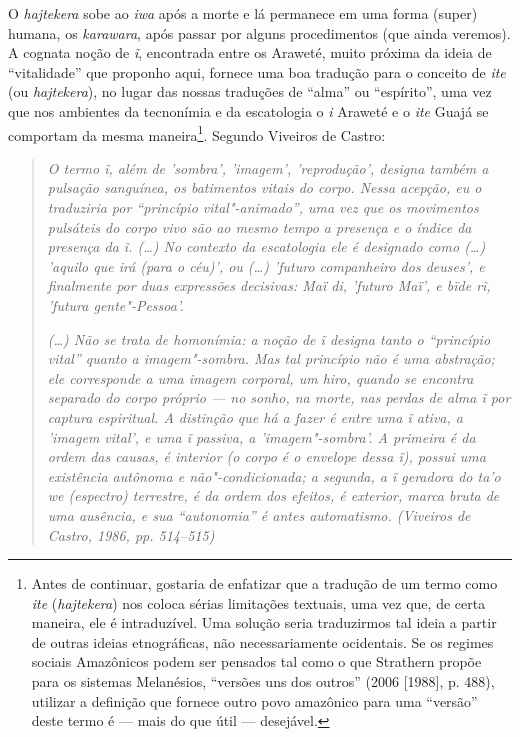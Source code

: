 O \emph{hajtekera} sobe ao \emph{iwa} após a morte e lá permanece em uma
forma (super) humana, os \emph{karawara}, após passar por alguns
procedimentos (que ainda veremos). A cognata noção de \emph{ĩ},
encontrada entre os Araweté, muito próxima da ideia de ``vitalidade'' que
proponho aqui, fornece uma boa tradução para o conceito de \emph{ite}
(ou \emph{hajtekera}), no lugar das nossas traduções de ``alma'' ou
``espírito'', uma vez que nos ambientes da tecnonímia e da escatologia o
\emph{i} Araweté e o \emph{ite} Guajá se comportam da mesma
maneira\footnote{Antes de continuar, gostaria de enfatizar que a
  tradução de um termo como \emph{ite} (\emph{hajtekera}) nos coloca
  sérias limitações textuais, uma vez que, de certa maneira, ele é
  intraduzível. Uma solução seria traduzirmos tal ideia a partir de
  outras ideias etnográficas, não necessariamente ocidentais. Se os
  regimes sociais Amazônicos podem ser pensados tal como o que Strathern
  propõe para os sistemas Melanésios, ``versões uns dos outros'' (2006 [1988], p. 488), utilizar a definição que fornece outro povo
  amazônico para uma ``versão'' deste termo é --- mais do que útil ---
  desejável.}. Segundo Viveiros de Castro:

\begin{quote}
\emph{O termo \emph{ĩ}, além de 'sombra', 'imagem', 'reprodução', designa
também a pulsação sanguínea, os batimentos vitais do corpo. Nessa
acepção, eu o traduziria por ``princípio vital"-animado'', uma vez que os
movimentos pulsáteis do corpo vivo são ao mesmo tempo a presença e o
índice da presença da \emph{ĩ}. (\ldots{}) No contexto da escatologia ele é
designado como (\ldots{}) 'aquilo que irá (para o céu)', ou (\ldots{}) 'futuro
companheiro dos deuses', e finalmente por duas expressões decisivas:
\emph{Maï di}, 'futuro Maï', e \emph{bïde rĩ}, 'futura gente"-Pessoa'.}

\noindent\emph{(\ldots{}) Não se trata de homonímia: a noção de \emph{ĩ} designa tanto o
``princípio vital'' quanto a imagem"-sombra. Mas tal princípio não é uma
abstração; ele corresponde a uma imagem corporal, um \emph{hiro}, quando
se encontra separado do corpo próprio --- no sonho, na morte, nas perdas
de alma \emph{ĩ} por captura espiritual. A distinção que há a fazer é
entre uma \emph{ĩ} {ativa}, a 'imagem vital', e uma \emph{ĩ} {passiva},
a 'imagem"-sombra'. A primeira é da ordem das causas, é {interior} (o
corpo é o envelope dessa \emph{ĩ}), possui uma existência autônoma e
não"-condicionada; a segunda, a \emph{ĩ} geradora do \emph{ta'o we}
(espectro) terrestre, é da ordem dos efeitos, é exterior, marca bruta de
uma ausência, e sua ``autonomia'' é antes automatismo. (Viveiros de
Castro, 1986, pp. 514--515)}
\end{quote}

